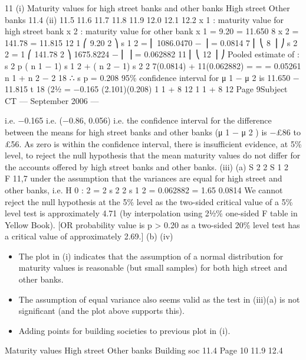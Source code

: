 \documentclass[a4paper,12pt]{article}
\begin{document}
\begin{enumerate}
\newpage
11
(i)
Maturity values for high street banks and other banks
High street
Other banks
11.4
(ii)
11.5
11.6
11.7
11.8
11.9
12.0
12.1
12.2
x 1 : maturity value for high street bank
x 2 : maturity value for other bank
x 1 = 9.20
= 11.650
8
x 2 = 141.78
= 11.815
12
1 ⎛
9.20 2 ⎞
s 1 2 = ⎜ 1086.0470 −
⎟ = 0.0814
7 ⎜ ⎝
8 ⎟ ⎠
s 2 2 =
1 ⎛
141.78 2 ⎞
1675.8224
−
⎜
⎟ = 0.062882
11 ⎜ ⎝
12 ⎟ ⎠
Pooled estimate of \sigma:
s 2 p
( n 1 − 1) s 1 2 + ( n 2 − 1) s 2 2 7(0.0814) + 11(0.062882)
=
=
= 0.05261
n 1 + n 2 − 2
18
∴ s p = 0.208
95\% confidence interval for μ 1 − μ 2 is
11.650 − 11.815 \pm t 18 (21⁄2%
= −0.165 \pm (2.101)(0.208)
1 1
+
8 12
1 1
+
8 12
Page 9Subject CT  — September 2006 — 

i.e. −0.165 
i.e. (−0.86, 0.056)
i.e. the confidence interval for the difference between the means for high street banks and other banks (μ 1 − μ 2 ) is −£86 to £56.
As zero is within the confidence interval, there is insufficient evidence, at 5\% level, to reject the null hypothesis that the mean maturity values do not differ
for the accounts offered by high street banks and other banks.
(iii)
(a)
S 2 2
S 1 2
~ F 11,7
under the assumption that the variances are equal for high street and
other banks,
i.e. H 0 :  2 =  2
s 2 2
s 1 2
=
0.062882
= 1.65
0.0814
We cannot reject the null hypothesis at the 5\% level as the two-sided critical value of a 5\% level test is approximately 4.71 (by interpolation using 21⁄2\% one-sided F table in Yellow Book).
[OR probability value is p > 0.20 as a two-sided 20\% level test has a critical value of approximately 2.69.]
(b)
(iv)
\begin{itemize}
\item The plot in (i) indicates that the assumption of a normal distribution for maturity values is reasonable (but small samples) for both high street
and other banks. 
\item The assumption of equal variance also seems valid as the test in (iii)(a) is not significant (and the plot above supports this).
\item Adding points for building societies to previous plot in (i).
\end{itemize}
Maturity values
High street
Other banks
Building soc
11.4
Page 10
11.9
12.4


\end{enumerate}
\end{document}
